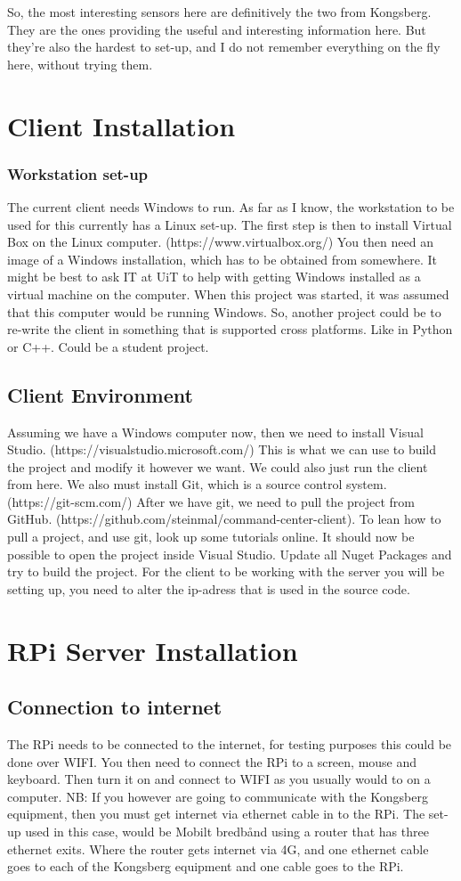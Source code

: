 \documentclass{article}
\begin{document}
So, the most interesting sensors here are definitively the two from Kongsberg.
They are the ones providing the useful and interesting information here. But they’re also the hardest to set-up, and I do not remember everything on the fly here, without trying them.


\section{Client Installation}
\subsubsection{Workstation set-up}
The current client needs Windows to run. As far as I know, the workstation to be used for this currently has a Linux set-up.
The first step is then to install Virtual Box on the Linux computer. (https://www.virtualbox.org/)
You then need an image of a Windows installation, which has to be obtained from somewhere.
It might be best to ask IT at UiT to help with getting Windows installed as a virtual machine on the computer. When this project was started, it was assumed that this computer would be running Windows. So, another project could be to re-write the client in something that is supported cross platforms. Like in Python or C++. Could be a student project.
\subsection{Client Environment}
Assuming we have a Windows computer now, then we need to install Visual Studio. (https://visualstudio.microsoft.com/)
This is what we can use to build the project and modify it however we want.
We could also just run the client from here.
We also must install Git, which is a source control system. (https://git-scm.com/)
After we have git, we need to pull the project from GitHub. (https://github.com/steinmal/command-center-client). To lean how to pull a project, and use git, look up some tutorials online.
It should now be possible to open the project inside Visual Studio.
Update all Nuget Packages and try to build the project.
For the client to be working with the server you will be setting up, you need to alter the ip-adress that is used in the source code.

\section{RPi Server Installation}
\subsection{Connection to internet}
The RPi needs to be connected to the internet, for testing purposes this could be done over WIFI.
You then need to connect the RPi to a screen, mouse and keyboard. Then turn it on and connect to WIFI as you usually would to on a computer.
NB: If you however are going to communicate with the Kongsberg equipment, then you must get internet via ethernet cable in to the RPi. The set-up used in this case, would be Mobilt bredbånd using a router that has three ethernet exits. Where the router gets internet via 4G, and one ethernet cable goes to each of the Kongsberg equipment and one cable goes to the RPi.
\end{document}
